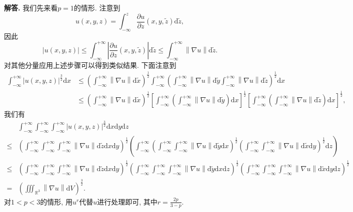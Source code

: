 \documentclass{article}
\newenvironment{solution}{\par\noindent\textbf{解答. }}{\par}
\begin{document}
\begin{solution}
我们先来看$p=1$的情形. 注意到
$$
u\left( x,y,z \right) =\int_{-\infty}^z{\frac{\partial u}{\partial z}\left( x,y,\tilde{z} \right) \mathrm{d}\tilde{z}},
$$
因此
$$
\left| u\left( x,y,z \right) \right|\le \int_{-\infty}^{+\infty}{\left| \frac{\partial u}{\partial z}\left( x,y,\tilde{z} \right) \right|\mathrm{d}\tilde{z}}\le \int_{-\infty}^{+\infty}{\left\| \nabla u \right\| \mathrm{d}\tilde{z}}.
$$
对其他分量应用上述步骤可以得到类似结果. 下面注意到
$$
\begin{aligned}
\int_{-\infty}^{+\infty}{\left| u\left( x,y,z \right) \right|^{\frac{3}{2}}\mathrm{d}x}&\le \left( \int_{-\infty}^{+\infty}{\left\| \nabla u \right\| \mathrm{d}\tilde{x}} \right) ^{\frac{1}{2}}\int_{-\infty}^{+\infty}{\left( \int_{-\infty}^{+\infty}{\left\| \nabla u \right\| \mathrm{d}\tilde{y}\int_{-\infty}^{+\infty}{\left\| \nabla u \right\| \mathrm{d}\tilde{z}}} \right) ^{\frac{1}{2}}\mathrm{d}x}
\\
&\le \left( \int_{-\infty}^{+\infty}{\left\| \nabla u \right\| \mathrm{d}\tilde{x}} \right) ^{\frac{1}{2}}\left[ \int_{-\infty}^{+\infty}{\left( \int_{-\infty}^{+\infty}{\left\| \nabla u \right\| \mathrm{d}\tilde{y}} \right) \mathrm{d}x} \right] ^{\frac{1}{2}}\left[ \int_{-\infty}^{+\infty}{\left( \int_{-\infty}^{+\infty}{\left\| \nabla u \right\| \mathrm{d}\tilde{z}} \right) \mathrm{d}x} \right] ^{\frac{1}{2}},
\end{aligned}
$$
我们有
$$
\begin{aligned}
&\int_{-\infty}^{+\infty}{\int_{-\infty}^{+\infty}{\int_{-\infty}^{+\infty}{\left| u\left( x,y,z \right) \right|^{\frac{3}{2}}\mathrm{d}x}\mathrm{d}y}\mathrm{d}z}
\\
\le& \left( \int_{-\infty}^{+\infty}{\int_{-\infty}^{+\infty}{\int_{-\infty}^{+\infty}{\left\| \nabla u \right\| \mathrm{d}\tilde{z}}\mathrm{d}x}\mathrm{d}y} \right) ^{\frac{1}{2}}\left( \int_{-\infty}^{+\infty}{\left( \int_{-\infty}^{+\infty}{\int_{-\infty}^{+\infty}{\left\| \nabla u \right\| \mathrm{d}\tilde{y}}\mathrm{d}x} \right) ^{\frac{1}{2}}\left( \int_{-\infty}^{+\infty}{\int_{-\infty}^{+\infty}{\left\| \nabla u \right\| \mathrm{d}\tilde{x}}\mathrm{d}y} \right) ^{\frac{1}{2}}\mathrm{d}z} \right) 
\\
\le& \left( \int_{-\infty}^{+\infty}{\int_{-\infty}^{+\infty}{\int_{-\infty}^{+\infty}{\left\| \nabla u \right\| \mathrm{d}\tilde{z}}\mathrm{d}x}\mathrm{d}y} \right) ^{\frac{1}{2}}\left( \int_{-\infty}^{+\infty}{\int_{-\infty}^{+\infty}{\int_{-\infty}^{+\infty}{\left\| \nabla u \right\| \mathrm{d}\tilde{y}}\mathrm{d}x}\mathrm{d}z} \right) ^{\frac{1}{2}}\left( \int_{-\infty}^{+\infty}{\int_{-\infty}^{+\infty}{\int_{-\infty}^{+\infty}{\left\| \nabla u \right\| \mathrm{d}\tilde{x}}\mathrm{d}y}\mathrm{d}z} \right) ^{\frac{1}{2}}
\\
=&\left( \iiint_{\mathbb{R} ^3}{\left\| \nabla u \right\| \mathrm{d}V} \right) ^{\frac{3}{2}}.
\end{aligned}
$$
对$1<p<3$的情形, 用$u^r$代替$u$进行处理即可, 其中$r=\frac{2p}{3-p}$.
\end{solution}
\newpage
\end{document}
